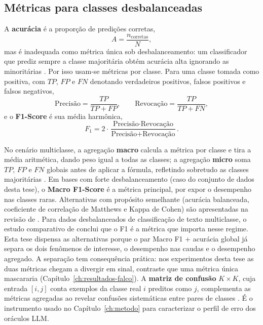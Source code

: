 \subsection{Métricas para classes desbalanceadas}
\label{subsec:ml_evaluation}

A \textbf{acurácia} é a proporção de predições corretas,
\begin{equation}
A = \frac{n_{\text{corretas}}}{N},
\label{eq:accuracy_ml}
\end{equation}
mas é inadequada como métrica única sob desbalanceamento: um classificador que
prediz sempre a classe majoritária obtém acurácia alta ignorando as
minoritárias \cite{Sokolova2009, Grandini2020, Barros2014}. Por isso usam-se
métricas por classe. Para uma classe tomada como positiva, com $TP$, $FP$ e
$FN$ denotando verdadeiros positivos, falsos positivos e falsos negativos,
\begin{equation}
\text{Precisão} = \frac{TP}{TP + FP}, \qquad
\text{Revocação} = \frac{TP}{TP + FN},
\label{eq:prec_rec_ml}
\end{equation}
e o \textbf{F1-Score} é sua média harmônica,
\begin{equation}
F_{1} = 2 \cdot \frac{\text{Precisão} \cdot \text{Revocação}}{\text{Precisão} + \text{Revocação}}.
\label{eq:f1_ml}
\end{equation}

No cenário multiclasse, a agregação \textbf{macro} calcula a métrica por
classe e tira a média aritmética, dando peso igual a todas as classes; a
agregação \textbf{micro} soma $TP$, $FP$ e $FN$ globais antes de aplicar a
fórmula, refletindo sobretudo as classes majoritárias \cite{Sokolova2009}. Em
bases com forte desbalanceamento (caso do conjunto de dados desta tese), o
\textbf{Macro F1-Score} é a métrica principal, por expor o desempenho nas
classes raras. Alternativas com propósito semelhante (acurácia balanceada,
coeficiente de correlação de Matthews e Kappa de Cohen) são apresentadas na
revisão de \citet{Grandini2020}. Para dados desbalanceados de classificação
de texto multiclasse, o estudo comparativo de \citet{Riyanto2023Comparative}
conclui que o F1 é a métrica que importa nesse regime. Esta tese dispensa as
alternativas porque o par Macro F1 + acurácia global já separa os dois
fenômenos de interesse, o desempenho nas caudas e o desempenho agregado. A
separação tem consequência prática: nos experimentos desta tese as duas
métricas chegam a divergir em sinal, contraste que uma métrica única
mascararia (Capítulo~\ref{ch:resultados-falco}). A
\textbf{matriz de confusão} $K \times K$, cuja entrada $[i,j]$ conta exemplos
da classe real $i$ preditos como $j$, complementa as métricas agregadas ao
revelar confusões sistemáticas entre pares de classes \cite{Han2012}. É o
instrumento usado no Capítulo~\ref{ch:metodo} para caracterizar o perfil de
erro dos oráculos LLM.

